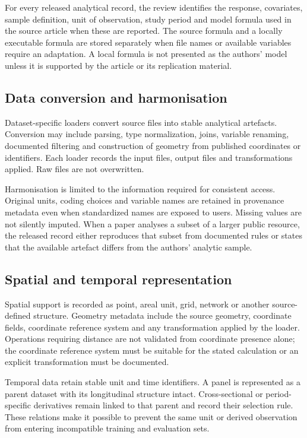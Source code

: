 \documentclass[10pt,a4paper]{article}
\begin{document}
For every released analytical record, the review identifies the response,
covariates, sample definition, unit of observation, study period and model
formula used in the source article when these are reported. The source
formula and a locally executable formula are stored separately when file
names or available variables require an adaptation. A local formula is not
presented as the authors' model unless it is supported by the article or its
replication material.

\subsection*{Data conversion and harmonisation}

Dataset-specific loaders convert source files into stable analytical
artefacts. Conversion may include parsing, type normalization, joins,
variable renaming, documented filtering and construction of geometry from
published coordinates or identifiers. Each loader records the input files,
output files and transformations applied. Raw files are not overwritten.

Harmonisation is limited to the information required for consistent access.
Original units, coding choices and variable names are retained in provenance
metadata even when standardized names are exposed to users. Missing values
are not silently imputed. When a paper analyses a subset of a larger public
resource, the released record either reproduces that subset from documented
rules or states that the available artefact differs from the authors'
analytic sample.

\subsection*{Spatial and temporal representation}

Spatial support is recorded as point, areal unit, grid, network or another
source-defined structure. Geometry metadata include the source geometry,
coordinate fields, coordinate reference system and any transformation applied
by the loader. Operations requiring distance are not validated from coordinate
presence alone; the coordinate reference system must be suitable for the
stated calculation or an explicit transformation must be documented.

Temporal data retain stable unit and time identifiers. A panel is represented
as a parent dataset with its longitudinal structure intact. Cross-sectional
or period-specific derivatives remain linked to that parent and record their
selection rule. These relations make it possible to prevent the same unit or
derived observation from entering incompatible training and evaluation sets.
\end{document}
